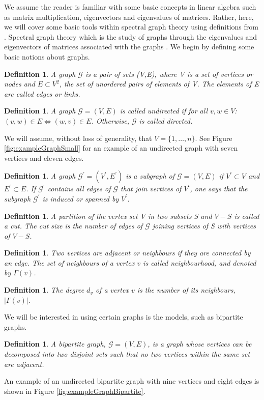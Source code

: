 \documentclass[12pt]{article}
\numberwithin{equation}{section}
\newtheorem{definition}[theorem]{Definition}
\begin{document}
We assume the reader is familiar with some basic concepts in linear algebra such as matrix multiplication, eigenvectors and eigenvalues of matrices. Rather, here, we will cover some basic tools within spectral graph theory using definitions from \cite{For10,New06a, Spi12, Spi07}. Spectral graph theory which is the study of graphs through the eigenvalues and eigenvectors of matrices associated with the graphs \cite{Spi12}. We begin by defining some basic notions about graphs.
\begin{definition}
\label{def:graph}
	A graph $\mathcal{G}$ is a pair of sets (V,E), where V is a set of vertices or nodes and $E \subset V^{2}$, the set of unordered pairs of elements of V. The elements of E are called edges or links.
\end{definition}
\begin{definition}
\label{def:undirectedGraph}
	A graph $\mathcal{G} = (V,E)$ is called undirected if for all $v,w \in V$: $(v,w) \in E \iff (w,v) \in E$. Otherwise, $\mathcal{G}$ is called directed.
\end{definition}
We will assume, without loss of generality, that $V = \{1,\dots,n\}$. See Figure \ref{fig:exampleGraphSmall} for an example of an undirected graph with seven vertices and eleven edges.
\begin{definition}
\label{def:subGraph}
	A graph $\mathcal{G}^{\prime} = (V^{\prime},E^{\prime})$ is a subgraph of $\mathcal{G} = (V,E)$ if $V^{\prime} \subset V$ and $E^{\prime} \subset E$. If $\mathcal{G}^{\prime}$ contains all edges of $\mathcal{G}$ that join vertices of $V^{\prime}$, one says that the subgraph $\mathcal{G}^{\prime}$ is induced or spanned by $V^{\prime}$.
\end{definition}
\begin{definition}
\label{def:cuts}
	A partition of the vertex set V in two subsets S and $V-S$ is called a cut. The cut size is the number of edges of $\mathcal{G}$ joining vertices of S with vertices of $V-S$.
\end{definition}
\begin{definition}
\label{def:neighbourhoodNode}
	Two vertices are adjacent or neighbours if they are connected by an edge. The set of neighbours of a vertex $v$ is called neighbourhood, and denoted by $\Gamma(v)$.
\end{definition}
\begin{definition}
\label{def:degreeNode}
	The degree $d_{v}$ of a vertex $v$ is the number of its neighbours, $\left\vert{\Gamma(v)}\right\vert$.
\end{definition}
We will be interested in using certain graphs is the models, such as bipartite graphs.
\begin{definition}
\label{def:bipartiteGraph}
	A bipartite graph, $\mathcal{G} = (V,E)$, is a graph whose vertices can be decomposed into two disjoint sets such that no two vertices within the same set are adjacent.
\end{definition}
An example of an undirected bipartite graph with nine vertices and eight edges is shown in Figure \ref{fig:exampleGraphBipartite}.
\end{document}
